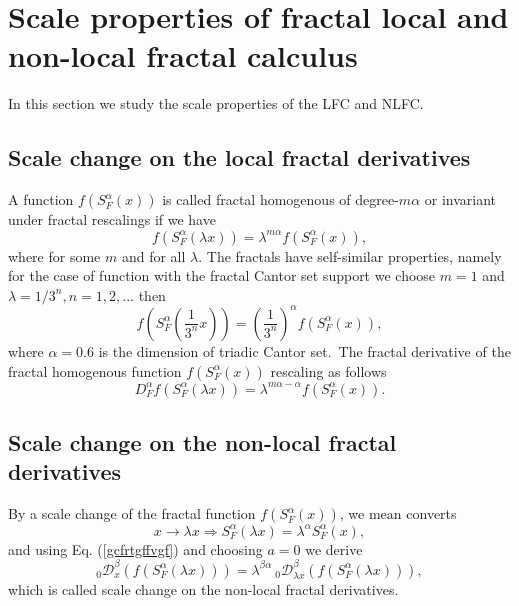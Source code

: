 \documentclass[12pt]{article}
\begin{document}
\section{Scale properties of fractal local and non-local fractal calculus \label{3-sec} }
In this section we study  the scale properties of the LFC and NLFC.
\subsection{Scale change on the local fractal derivatives}
A function $f(S_{F}^{\alpha}(x))$ is called fractal homogenous of degree-$m\alpha$ or invariant under  fractal rescalings if we have
\begin{equation}\label{xdr}
  f(S_{F}^{\alpha}(\lambda x))=\lambda^{m \alpha}f(S_{F}^{\alpha}(x)),
\end{equation}
where for some $m$ and for all $\lambda$. The fractals have self-similar properties, namely for the case of function with the fractal  Cantor set support we choose $m=1$ and $\lambda=1/3^n, n=1,2,...$ then
\begin{equation}\label{xdrmn}
  f(S_{F}^{\alpha}(\frac{1}{3^n} x))=(\frac{1}{3^n})^{\alpha}f(S_{F}^{\alpha}(x)),
\end{equation}
where $\alpha=0.6 $ is the dimension of triadic Cantor set.~The fractal derivative of the fractal homogenous function  $f(S_{F}^{\alpha}(x))$   rescaling   as follows
\begin{equation}\label{xddcxsr}
  D_{F}^{\alpha}f(S_{F}^{\alpha}(\lambda x))=\lambda^{m\alpha-\alpha}f(S_{F}^{\alpha}(x)).
\end{equation}
\subsection{Scale change on the non-local fractal derivatives}
By a scale change of the fractal function $f(S_{F}^{\alpha}(x))$, we mean converts
\begin{equation}
x \rightarrow \lambda x \Rightarrow S_{F}^{\alpha}(\lambda x)=\lambda^{\alpha} S_{F}^{\alpha}(x),
\end{equation}
and using Eq. (\ref{gcfrtgffvgf}) and choosing $a=0$  we derive
\begin{equation}\label{xsaz258a}
  _{0}\mathcal{D}_{x}^{\beta}(f(S_{F}^{\alpha}(\lambda x)) )=\lambda^{\beta \alpha}~_{0}\mathcal{D}_{\lambda x}^{\beta}(f(S_{F}^{\alpha}(\lambda x)) ),
\end{equation}
which is called scale change on the non-local fractal derivatives.\\
\end{document}
